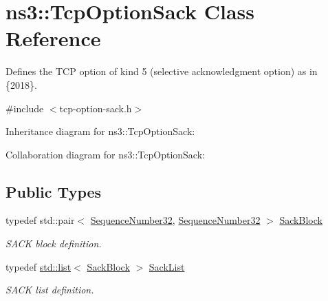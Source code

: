 \hypertarget{classns3_1_1TcpOptionSack}{}\section{ns3\+:\+:Tcp\+Option\+Sack Class Reference}
\label{classns3_1_1TcpOptionSack}


Defines the T\+CP option of kind 5 (selective acknowledgment option) as in \{2018\}.  




{\ttfamily \#include $<$tcp-\/option-\/sack.\+h$>$}



Inheritance diagram for ns3\+:\+:Tcp\+Option\+Sack\+:


Collaboration diagram for ns3\+:\+:Tcp\+Option\+Sack\+:
\subsection*{Public Types}
\begin{DoxyCompactItemize}
\item 
typedef std\+::pair$<$ \hyperlink{group__network_gacb2070e4e98d2d5135c9bede58f07a03}{Sequence\+Number32}, \hyperlink{group__network_gacb2070e4e98d2d5135c9bede58f07a03}{Sequence\+Number32} $>$ \hyperlink{classns3_1_1TcpOptionSack_a9e1d07d8729fd3ac5ead7305794675c3}{Sack\+Block}
\begin{DoxyCompactList}\small\item\em S\+A\+CK block definition. \end{DoxyCompactList}\item 
typedef \hyperlink{openflow-interface_8h_afd9bcfa176617760671b67580f536fa7}{std\+::list}$<$ \hyperlink{classns3_1_1TcpOptionSack_a9e1d07d8729fd3ac5ead7305794675c3}{Sack\+Block} $>$ \hyperlink{classns3_1_1TcpOptionSack_a2aa2d721c71424680d79ebaa079f264a}{Sack\+List}
\begin{DoxyCompactList}\small\item\em S\+A\+CK list definition. \end{DoxyCompactList}\end{DoxyCompactItemize}
